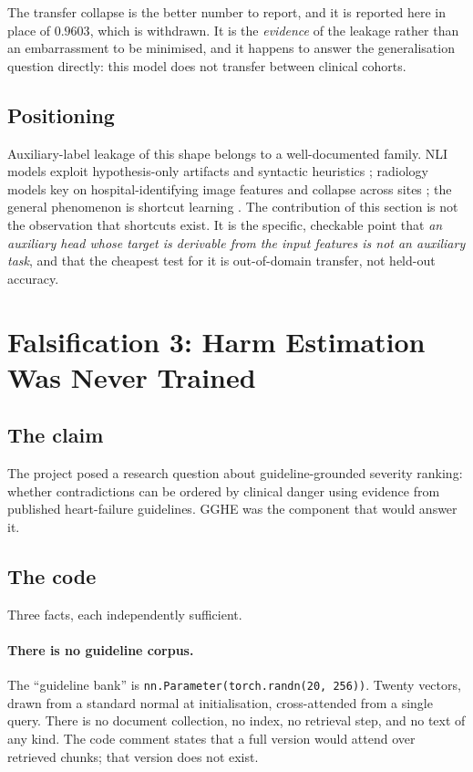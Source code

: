The transfer collapse is the better number to report, and it is reported here in
place of $0.9603$, which is withdrawn. It is the \emph{evidence} of the leakage
rather than an embarrassment to be minimised, and it happens to answer the
generalisation question directly: this model does not transfer between clinical
cohorts.

\subsection{Positioning}

Auxiliary-label leakage of this shape belongs to a well-documented family. NLI
models exploit hypothesis-only artifacts \citep{poliak2018hypothesis,
gururangan2018artifacts} and syntactic heuristics \citep{mccoy2019hans};
radiology models key on hospital-identifying image features and collapse across
sites \citep{zech2018generalization}; the general phenomenon is shortcut
learning \citep{geirhos2020shortcut}. The contribution of this section is not
the observation that shortcuts exist. It is the specific, checkable point that
\emph{an auxiliary head whose target is derivable from the input features is not
an auxiliary task}, and that the cheapest test for it is out-of-domain transfer,
not held-out accuracy.

\section{Falsification 3: Harm Estimation Was Never Trained}
\label{sec:c3}

\subsection{The claim}

The project posed a research question about guideline-grounded severity ranking:
whether contradictions can be ordered by clinical danger using evidence from
published heart-failure guidelines. GGHE was the component that would answer it.

\subsection{The code}

Three facts, each independently sufficient.

\paragraph{There is no guideline corpus.} The ``guideline bank'' is
\texttt{nn.Parameter(torch.randn(20, 256))}. Twenty vectors, drawn from a
standard normal at initialisation, cross-attended from a single query. There is
no document collection, no index, no retrieval step, and no text of any kind. The
code comment states that a full version would attend over retrieved chunks; that
version does not exist.


